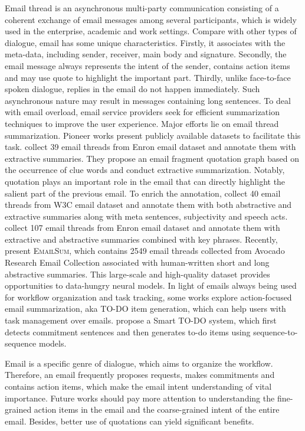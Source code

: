 \label{sec:email}
Email thread is an asynchronous multi-party communication consisting of a coherent exchange of email messages among several participants, which is widely used in the enterprise, academic and work settings. 
Compare with other types of dialogue, email has some unique characteristics. 
Firstly, it associates with the meta-data, including sender, receiver, main body and signature.
Secondly, the email message always represents the intent of the sender, contains action items and may use quote to highlight the important part. 
Thirdly, unlike face-to-face spoken dialogue, replies in the email do not happen immediately. Such asynchronous nature may result in messages containing long sentences.
To deal with email overload, email service providers seek for efficient summarization techniques to improve the user experience.
Major efforts lie on email thread summarization. Pioneer works present publicly available datasets to facilitate this task. 
 collect 39 email threads from Enron email dataset and annotate them with extractive summaries.
They propose an email fragment quotation graph based on the occurrence of clue words and conduct extractive summarization. 
Notably, quotation plays an important role in the email that can directly highlight the salient part of the previous email.
To enrich the annotation, 
 collect 40 email threads from W3C email dataset and annotate them with both abstractive and extractive summaries along with meta sentences, subjectivity and speech acts.
 collect 107 email threads from Enron email dataset and annotate them with extractive and abstractive summaries combined with key phrases. 
Recently,  present \textsc{EmailSum}, which contains 2549 email threads collected from Avocado Research Email Collection associated with human-written short and long abstractive summaries. This large-scale and high-quality dataset provides opportunities to data-hungry neural models.
In light of emails always being used for workflow organization and task tracking, some works explore action-focused email summarization, aka TO-DO item generation, which can help users with task management over emails.
 propose a Smart TO-DO system, which first detects commitment sentences and then generates to-do items using sequence-to-sequence models.

Email is a specific genre of dialogue, which aims to organize the workflow.
Therefore, an email frequently proposes requests, makes commitments and contains action items, which make the email intent understanding of vital importance. 
Future works should pay more attention to understanding the fine-grained action items in the email and the coarse-grained intent of the entire email.
Besides, better use of quotations can yield significant benefits.

